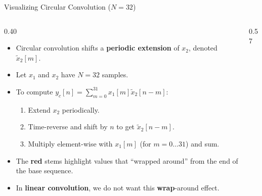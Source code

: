 \begin{frame}{Visualizing Circular Convolution ($N=32$)}
    \begin{columns}
        \begin{column}{0.40\textwidth}
            \begin{itemize}
                \item Circular convolution shifts a \textbf{periodic extension} of $x_2$, denoted $\tilde{x}_2[m]$.
                \item Let $x_1$ and $x_2$ have $N=32$ samples.
                \item To compute $y_c[n] = \sum_{m=0}^{31} x_1[m] \tilde{x}_2[n-m]$:
                      \begin{enumerate}
                          \item Extend $x_2$ periodically.
                          \item Time-reverse and shift by $n$ to get $\tilde{x}_2[n-m]$.
                          \item Multiply element-wise with $x_1[m]$ (for $m=0 \dots 31$) and sum.
                      \end{enumerate}
                \item The \textcolor{red!80}{\textbf{red}} stems highlight values that ``wrapped around'' from the end of the base sequence.
                \item In \textbf{linear convolution}, we do not want this \textbf{wrap}-around effect.
            \end{itemize}
        \end{column}
        \begin{column}{0.57\textwidth}
            \centering
            \vspace{0.1cm}
\end{column}
\end{columns}
\end{frame}
